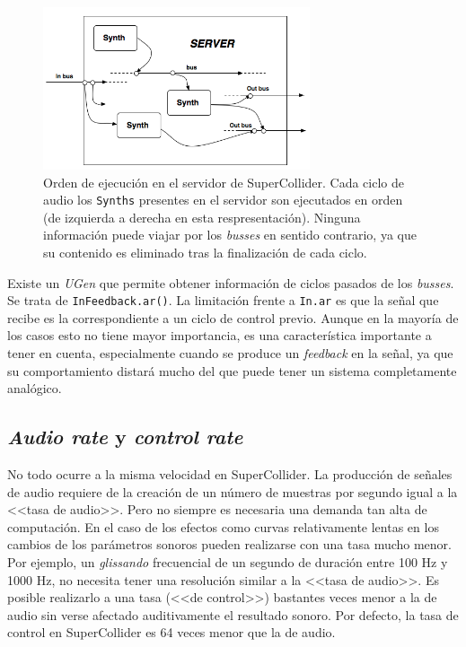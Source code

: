 \begin{figure}
	\centering
	\includegraphics[width=0.7\textwidth]{images/sc_server}
	\caption[Orden de ejecución en el servidor de SuperCollider]{Orden de ejecución en el servidor de SuperCollider. Cada ciclo de audio los \texttt{Synths} presentes en el servidor son ejecutados en orden (de izquierda a derecha en esta respresentación). Ninguna información puede viajar por los \textit{busses} en sentido contrario, ya que su contenido es eliminado tras la finalización de cada ciclo.}
	\label{fig:sc_server}
\end{figure}

Existe un \textit{UGen} que permite obtener información de ciclos pasados de los \textit{busses}. Se trata de \texttt{InFeedback.ar()}. La limitación frente a \texttt{In.ar} es que la señal que recibe es la correspondiente a un ciclo de control previo. Aunque en la mayoría de los casos esto no tiene mayor importancia, es una característica importante a tener en cuenta, especialmente cuando se produce un \textit{feedback} en la señal, ya que su comportamiento distará mucho del que puede tener un sistema completamente analógico. 

\subsection{\textit{Audio rate} y \textit{control rate}}
No todo ocurre a la misma velocidad en SuperCollider. La producción de señales de audio requiere de la creación de un número de muestras por segundo igual a la <<tasa de audio>>. Pero no siempre es necesaria una demanda tan alta de computación. En el caso de los efectos como curvas relativamente lentas en los cambios de los parámetros sonoros pueden realizarse con una tasa mucho menor. Por ejemplo, un \textit{glissando} frecuencial de un segundo de duración entre 100 Hz y 1000 Hz, no necesita tener una resolución similar a la <<tasa de audio>>. Es posible realizarlo a una tasa (<<de control>>) bastantes veces menor a la de audio sin verse afectado auditivamente el resultado sonoro. Por defecto, la tasa de control en SuperCollider es 64 veces menor que la de audio.

